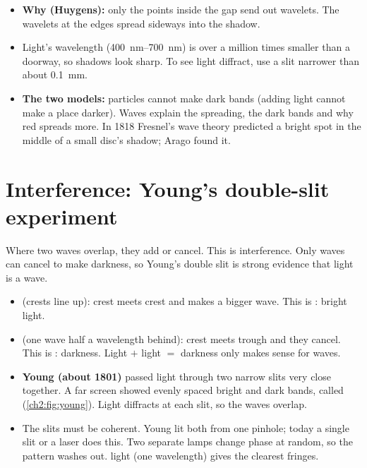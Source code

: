 \begin{itemize}
  \item \textbf{Why (Huygens):} only the points inside the gap send out wavelets. The
        wavelets at the edges spread sideways into the shadow.
  \item Light's wavelength (\qtyrange{400}{700}{nm}) is over a million times smaller than a
        doorway, so shadows look sharp. To see light diffract, use a slit narrower than about
        \qty{0.1}{mm}.
  \item \textbf{The two models:} particles cannot make dark bands (adding light cannot make
        a place darker). Waves explain the spreading, the dark bands and why red spreads
        more. In 1818 Fresnel's wave theory predicted a bright spot in the middle of a small
        disc's shadow; Arago found it.
\end{itemize}

\section{Interference: Young's double-slit experiment}\label{ch2:sec:interference}

\begin{bigidea}
Where two waves overlap, they add or cancel. This is interference. Only waves can cancel
to make darkness, so Young's double slit is strong evidence that light is a wave.
\end{bigidea}

\begin{keywords}
\end{keywords}

\begin{itemize}
  \item {} (crests line up): crest meets crest and makes a bigger wave. This
        is : bright light.
  \item {} (one wave half a wavelength behind): crest meets
        trough and they cancel. This is : darkness. Light
        $+$ light $=$ darkness only makes sense for waves.
  \item \textbf{Young (about 1801)} passed light through two narrow slits very close
        together. A far screen showed evenly spaced bright and dark bands, called
         (\cref{ch2:fig:young}). Light diffracts at each slit, so the waves
        overlap.
  \item The slits must be coherent. Young lit both from one pinhole; today a single slit or
        a laser does this. Two separate lamps change phase at random, so the pattern washes
        out.  light (one wavelength) gives the clearest fringes.
\end{itemize}

